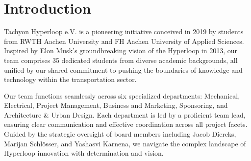 \chapter{Introduction}

Tachyon Hyperloop e.V. is a pioneering initiative conceived in 2019 by students from RWTH Aachen University and FH Aachen University of Applied Sciences. Inspired by Elon Musk's groundbreaking vision of the Hyperloop in 2013, our team comprises 35 dedicated students from diverse academic backgrounds, all unified by our shared commitment to pushing the boundaries of knowledge and technology within the transportation sector.

Our team functions seamlessly across six specialized departments: Mechanical, Electrical, Project Management, Business and Marketing, Sponsoring, and Architecture \& Urban Design. Each department is led by a proficient team lead, ensuring clear communication and effective coordination across all project facets. Guided by the strategic oversight of board members including Jacob Diercks, Marijan Schlösser, and Yashasvi Karnena, we navigate the complex landscape of Hyperloop innovation with determination and vision.
